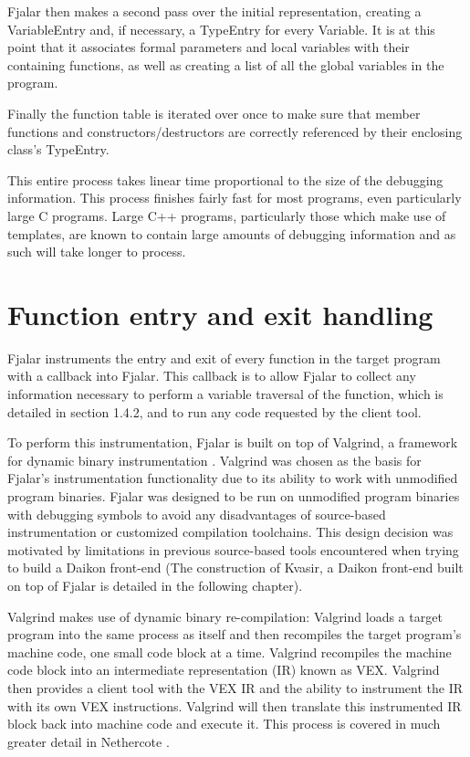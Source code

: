 \documentclass[11pt]{article}
\begin{document}
Fjalar then makes a second pass over the initial representation,
creating a VariableEntry and, if necessary, a TypeEntry for every
Variable. It is at this point that it associates formal parameters and
local variables with their containing functions, as well as creating a
list of all the global variables in the program.

Finally the function table is iterated over once to make sure that
member functions and constructors/destructors are correctly referenced
by their enclosing class's TypeEntry.

This entire process takes linear time proportional to the size of the
debugging information. This process finishes fairly fast for most
programs, even particularly large C programs. Large C++ programs,
particularly those which make use of templates, are known to contain
large amounts of debugging information \cite{rotithor1999measurement}
and as such will take longer to process.

\section{Function entry and exit handling}
Fjalar instruments the entry and exit of every function in the target
program with a callback into Fjalar. This callback is to allow Fjalar
to collect any information necessary to perform a variable traversal
of the function, which is detailed in section 1.4.2, and to run any
code requested by the client tool.

To perform this instrumentation, Fjalar is built on top of Valgrind, a
framework for dynamic binary instrumentation
\cite{nethercote2007valgrind}. Valgrind was chosen as the basis for
Fjalar's instrumentation functionality due to its ability to work
with unmodified program binaries. Fjalar was designed to be run
on unmodified program binaries with debugging symbols to avoid any
disadvantages of source-based instrumentation or customized
compilation toolchains. This design decision was motivated by
limitations in previous source-based tools encountered when trying to
build a Daikon front-end \cite{Guo2006} (The construction of Kvasir, 
a Daikon front-end built on top of Fjalar is detailed in the following 
chapter).

Valgrind makes use of dynamic binary re-compilation: Valgrind loads a
target program into the same process as itself and then recompiles the
target program's machine code, one small code block at a
time. Valgrind recompiles the machine code block into an intermediate
representation (IR) known as VEX. Valgrind then provides a client tool
with the VEX IR and the ability to instrument the IR with its own VEX
instructions. Valgrind will then translate this instrumented IR block
back into machine code and execute it. This process is covered in much
greater detail in Nethercote \cite{nethercote2007valgrind}.
\end{document}

